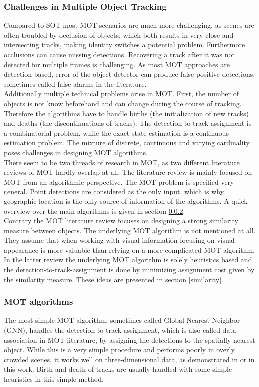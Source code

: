 \documentclass[12pt,a4paper]{article}
\begin{document}
\subsubsection{Challenges in Multiple Object Tracking}
Compared to SOT most MOT scenarios are much more challenging, as scenes are often troubled by occlusion of objects, which both results in very close and intersecting tracks, making identity switches a potential problem. Furthermore occlusions can cause missing detections. Recovering a track after it was not detected for multiple frames is challenging. As most MOT approaches are detection based, error of the object detector can produce false positive detections, sometimes called false alarms in the literature. \\
Additionally multiple technical problems arise in MOT. First, the number of objects is not know beforehand and can change during the course of tracking. Therefore the algorithms have to handle births (the initialization of new tracks) and deaths (the discontinuations of tracks). The detection-to-track-assignment is a combinatorial problem, while the exact state estimation is a continuous estimation problem. The mixture of discrete, continuous and varying cardinality poses challenges in designing MOT algorithms.\\
There seem to be two threads of research in MOT, as two different literature reviews of MOT hardly overlap at all. The literature review \cite{MTT} is mainly focused on MOT from an algorithmic perspective. The MOT problem is specified very general. Point detections are considered as the only input, which is why geographic location is the only source of information of the algorithms. A quick overview over the main algorithms is given in section \ref{mot_algorithms}. \\
Contrary the MOT literature review \cite{mot_lit_rev} focuses on designing a strong similarity measure between objects. The underlying MOT algorithm is not mentioned at all. They assume that when working with visual information focusing on visual appearance is more valuable than relying on a more complicated MOT algorithm. In the latter review the underlying MOT algorithm is solely heuristics based and the detection-to-track-assignment is done by minimizing assignment cost given by the similarity measure. These ideas are presented in section \ref{similarity}. 



\subsubsection{MOT algorithms}
\label{mot_algorithms}
The most simple MOT algorithm, sometimes called Global Nearest Neighbor (GNN), handles the detection-to-track-assignment, which is also called data association in MOT literature, by assigning the detections to the spatially nearest object. While this is a very simple procedure and performs poorly in overly crowded scenes, it works well on three-dimensional data, as demonstrated in \cite{3d_kalman} or in this work. Birth and death of tracks are usually handled with some simple heuristics in this simple method.\\
\end{document}
